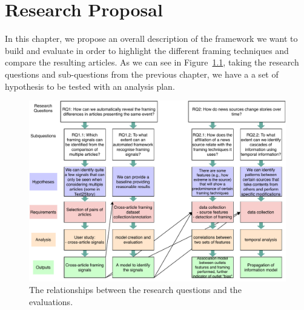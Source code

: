 \chapter{Research Proposal}
\label{chap:proposal}





In this chapter, we propose an overall description of the framework we want to build and evaluate in order to highlight the different framing techniques and compare the resulting articles.
As we can see in Figure~\ref{fig:diagram}, taking the research questions and sub-questions from the previous chapter, we have a a set of hypothesis to be tested with an analysis plan.

\begin{figure}[!htb]
    \centering
    \includegraphics[width=\linewidth]{figures/diagram.pdf}
    \caption{The relationships between the research questions and the evaluations.}
    \label{fig:diagram}
\end{figure}

